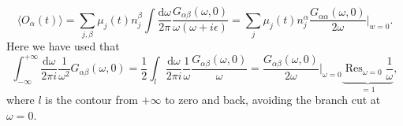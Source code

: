 \documentclass[master,       %
               twoside,        %
               BCOR10mm,       %
               english,ngerman, %
               ]{GAUBM}
\begin{document}
\begin{otherlanguage}{english}
\begin{equation}
	\langle O_\alpha(t) \rangle = \sum_{j, \beta} \mu_j(t) n^\beta_j \int \frac{\mathrm{d} \omega}{2 \pi} \frac{G_{\alpha \beta}(\omega, 0)} { \omega (\omega + i \epsilon)} =  \sum_{j} \mu_j(t) n^\alpha_j \frac{G_{\alpha \alpha}(\omega, 0)}{2 \omega} \Big|_{w = 0}.
	\label{eq:chemical_potentials_linear_response}
\end{equation}
Here we have used that
\begin{equation}
	\int_{-\infty}^{+\infty} \frac{\mathrm{d} \omega}{2\pi i} \frac{1}{\omega^2} G_{\alpha \beta}(\omega, 0) = \frac{1}{2} \int_l \frac{\mathrm{d} \omega}{2\pi i} \frac{1}{\omega} \frac{G_{\alpha \beta}(\omega, 0)}{\omega} = \frac{G_{\alpha \beta}(\omega, 0)}{2 \omega} \Big|_{\omega = 0} \underbrace{\operatorname{Res}_{\omega = 0} \frac{1}{\omega}}_{= 1},
\end{equation}
where $l$ is the contour from $+\infty$ to zero and back, avoiding the branch cut at $\omega = 0$.


\end{otherlanguage}
\end{document}
